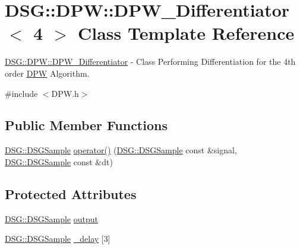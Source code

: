 \hypertarget{class_d_s_g_1_1_d_p_w_1_1_d_p_w___differentiator_3_014_01_4}{\section{D\+S\+G\+:\+:D\+P\+W\+:\+:D\+P\+W\+\_\+\+Differentiator$<$ 4 $>$ Class Template Reference}
\label{class_d_s_g_1_1_d_p_w_1_1_d_p_w___differentiator_3_014_01_4}
}


\hyperlink{class_d_s_g_1_1_d_p_w_1_1_d_p_w___differentiator}{D\+S\+G\+::\+D\+P\+W\+::\+D\+P\+W\+\_\+\+Differentiator} -\/ Class Performing Differentiation for the 4th order \hyperlink{namespace_d_s_g_1_1_d_p_w}{D\+P\+W} Algorithm.  




{\ttfamily \#include $<$D\+P\+W.\+h$>$}

\subsection*{Public Member Functions}
\begin{DoxyCompactItemize}
\item 
\hyperlink{namespace_d_s_g_ac39a94cd27ebcd9c1e7502d0c624894a}{D\+S\+G\+::\+D\+S\+G\+Sample} \hyperlink{class_d_s_g_1_1_d_p_w_1_1_d_p_w___differentiator_3_014_01_4_aa86877ca4c21091864246dd825575f7c}{operator()} (\hyperlink{namespace_d_s_g_ac39a94cd27ebcd9c1e7502d0c624894a}{D\+S\+G\+::\+D\+S\+G\+Sample} const \&signal, \hyperlink{namespace_d_s_g_ac39a94cd27ebcd9c1e7502d0c624894a}{D\+S\+G\+::\+D\+S\+G\+Sample} const \&dt)
\end{DoxyCompactItemize}
\subsection*{Protected Attributes}
\begin{DoxyCompactItemize}
\item 
\hyperlink{namespace_d_s_g_ac39a94cd27ebcd9c1e7502d0c624894a}{D\+S\+G\+::\+D\+S\+G\+Sample} \hyperlink{class_d_s_g_1_1_d_p_w_1_1_d_p_w___differentiator_3_014_01_4_a5fd7e2dc19c470cacb8e23942c1afdbb}{output}
\item 
\hyperlink{namespace_d_s_g_ac39a94cd27ebcd9c1e7502d0c624894a}{D\+S\+G\+::\+D\+S\+G\+Sample} \hyperlink{class_d_s_g_1_1_d_p_w_1_1_d_p_w___differentiator_3_014_01_4_aacd153f49201708823a05aad2506ede9}{\+\_\+delay} \mbox{[}3\mbox{]}
\end{DoxyCompactItemize}


